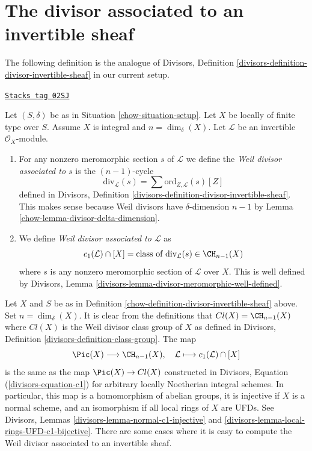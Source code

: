 \section{The divisor associated to an invertible sheaf}
\label{chow-section-divisor-invertible-sheaf}
The following definition is the analogue of
Divisors, Definition \ref{divisors-definition-divisor-invertible-sheaf}
in our current setup.

\begin{definition}
\label{chow-definition-divisor-invertible-sheaf}
\href{https://stacks.math.columbia.edu/tag/02SJ}{\texttt{Stacks tag 02SJ}}

Let $(S, \delta)$ be as in Situation \ref{chow-situation-setup}.
Let $X$ be locally of finite type over $S$. Assume $X$ is
integral and $n = \dim_\delta(X)$.
Let $\mathcal{L}$ be an invertible $\mathcal{O}_X$-module.
\begin{enumerate}
\item For any nonzero meromorphic section $s$ of $\mathcal{L}$
we define the {\it Weil divisor associated to $s$} is the
$(n - 1)$-cycle
$$
\text{div}_\mathcal{L}(s) =
\sum \text{ord}_{Z, \mathcal{L}}(s) [Z]
$$
defined in Divisors, Definition
\ref{divisors-definition-divisor-invertible-sheaf}.
This makes sense because Weil divisors have $\delta$-dimension $n - 1$
by Lemma \ref{chow-lemma-divisor-delta-dimension}.
\item We define {\it Weil divisor associated to $\mathcal{L}$} as
$$
c_1(\mathcal{L}) \cap [X] =
\text{class of }\text{div}_\mathcal{L}(s) \in \CH_{n - 1}(X)
$$
where $s$ is any nonzero meromorphic section of $\mathcal{L}$ over
$X$. This is well defined by
Divisors, Lemma \ref{divisors-lemma-divisor-meromorphic-well-defined}.
\end{enumerate}
\end{definition}

Let $X$ and $S$ be as in Definition \ref{chow-definition-divisor-invertible-sheaf}
above. Set $n = \dim_\delta(X)$. It is clear from the definitions that
$Cl(X) = \CH_{n - 1}(X)$ where $Cl(X)$ is the Weil divisor class group of $X$
as defined in Divisors, Definition \ref{divisors-definition-class-group}.
The map
$$
\Pic(X) \longrightarrow \CH_{n - 1}(X), \quad
\mathcal{L} \longmapsto c_1(\mathcal{L}) \cap [X]
$$
is the same as the map $\Pic(X) \to Cl(X)$ constructed in
Divisors, Equation (\ref{divisors-equation-c1}) for arbitrary
locally Noetherian integral schemes. In particular, this map
is a homomorphism of abelian groups, it is injective if $X$ is
a normal scheme, and an isomorphism if all local rings of $X$
are UFDs. See Divisors, Lemmas \ref{divisors-lemma-normal-c1-injective} and
\ref{divisors-lemma-local-rings-UFD-c1-bijective}.
There are some cases where it is easy to compute the
Weil divisor associated to an invertible sheaf.

